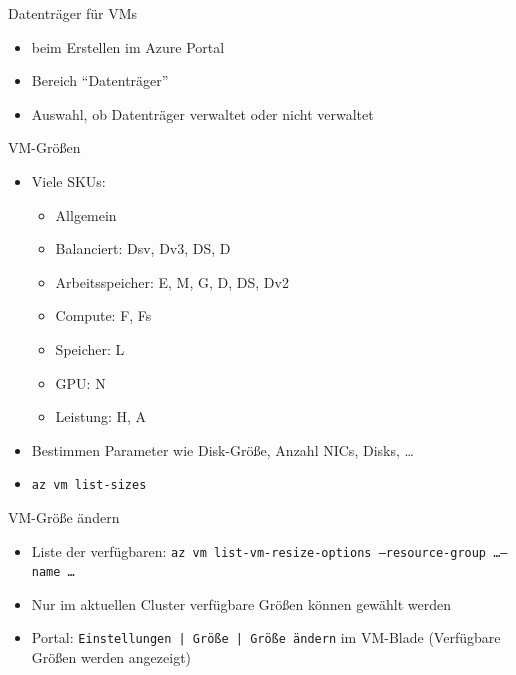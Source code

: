\begin{flashcard}[Definition]{Datenträger für VMs}
    \begin{itemize}
        \item beim Erstellen im Azure Portal
        \item Bereich ``Datenträger''
        \item Auswahl, ob Datenträger verwaltet oder nicht verwaltet
    \end{itemize}
\end{flashcard}


\begin{flashcard}[Definition]{VM-Größen}
    \begin{itemize}
        \item Viele SKUs:
            \begin{itemize}
                \item Allgemein
                \item Balanciert: Dsv, Dv3, DS, D
                \item Arbeitsspeicher: E, M, G, D, DS, Dv2
                \item Compute: F, Fs
                \item Speicher: L
                \item GPU: N
                \item Leistung: H, A
            \end{itemize}
        \item Bestimmen Parameter wie Disk-Größe, Anzahl NICs, Disks, \ldots
        \item \texttt{az vm list-sizes}
    \end{itemize}
\end{flashcard}

\begin{flashcard}[Definition]{VM-Größe ändern}
    \begin{itemize}
        \item Liste der verfügbaren:\newline
            \texttt{az vm list-vm-resize-options --resource-group \ldots --name \ldots}
        \item Nur im aktuellen Cluster verfügbare Größen können gewählt werden
        \item Portal: \texttt{Einstellungen | Größe | Größe ändern} im VM-Blade\newline
            (Verfügbare Größen werden angezeigt)
    \end{itemize}
\end{flashcard}

